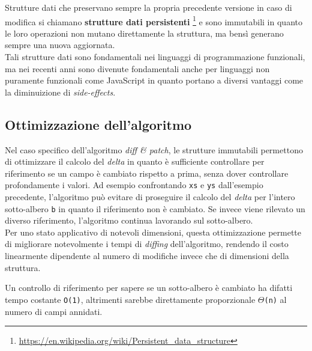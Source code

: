 Strutture dati che preservano sempre la propria precedente versione in caso di modifica si chiamano \textbf{strutture dati persistenti} \footnote{\url{https://en.wikipedia.org/wiki/Persistent_data_structure}} e sono immutabili in quanto le loro operazioni non mutano direttamente la struttura, ma bensì generano sempre una nuova aggiornata. \\

Tali strutture dati sono fondamentali nei linguaggi di programmazione funzionali, ma nei recenti anni sono divenute fondamentali anche per linguaggi non puramente funzionali come JavaScript in quanto portano a diversi vantaggi come la diminuizione di \textit{side-effects}.

\subsection{Ottimizzazione dell'algoritmo}

Nel caso specifico dell'algoritmo \textit{diff \& patch}, le strutture immutabili permettono di ottimizzare il calcolo del \textit{delta} in quanto è sufficiente controllare per riferimento se un campo è cambiato rispetto a prima, senza dover controllare profondamente i valori. Ad esempio confrontando \texttt{xs} e \texttt{ys} dall'esempio precedente, l'algoritmo può evitare di proseguire il calcolo del \textit{delta} per l'intero sotto-albero \texttt{b} in quanto il riferimento non è cambiato. Se invece viene rilevato un diverso riferimento, l'algoritmo continua lavorando sul sotto-albero. \\

Per uno stato applicativo di notevoli dimensioni, questa ottimizzazione permette di migliorare notevolmente i tempi di \textit{diffing} dell'algoritmo, rendendo il costo linearmente dipendente al numero di modifiche invece che di dimensioni della struttura.

Un controllo di riferimento per sapere se un sotto-albero è cambiato ha difatti tempo costante \texttt{O(1)}, altrimenti sarebbe direttamente proporzionale \texttt{$\Theta$(n)} al numero di campi annidati.
